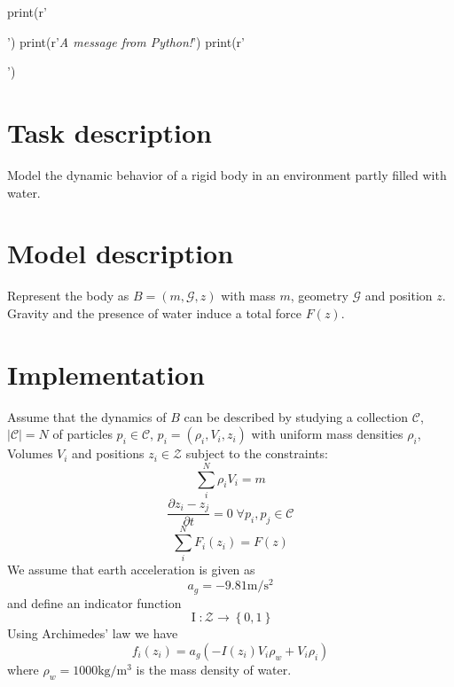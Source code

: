 
\begin{pycode}
print(r'\begin{center}')
print(r'\textit{A message from Python!}')
print(r'\end{center}')
\end{pycode}
\section{Task description}
Model the dynamic behavior of a rigid body in an environment partly filled with water.

\section{Model description}
Represent the body as $B = \left(m, \mathcal{G}, z\right)$ with mass $m$, geometry $\mathcal{G}$ and position $z$. 
Gravity and the presence of water induce a total force $F(z)$.  

\section{Implementation}
Assume that the dynamics of $B$  can be described by studying a collection $\mathcal{C}$, $|\mathcal{C}| = N$ of particles $p_i \in \mathcal{C}$, $p_i = \left(\rho_i, V_i, z_i\right)$ with uniform mass densities $\rho_i$, Volumes $V_i$ and positions $z_i \in \mathcal{Z}$ subject to the constraints:
$$\sum\limits_i^N \rho_i V_i = m$$
$$\frac{\partial z_i - z_j}{\partial t} = 0 \; \forall p_i, p_j \in \mathcal{C}$$
$$\sum\limits_i^N F_i(z_i) = F(z)$$
We assume that earth acceleration is given as
$$a_g = - \num{9.81}  \si{\metre\per\square\second}$$ 
and define an indicator function
$$\operatorname{I}: \mathcal{Z} \to \left\{ 0, 1\right\}$$
Using Archimedes' law we have 
$$f_i(z_i) = a_g(- I(z_i) V_i \rho_w + V_i \rho_i)$$
where $\rho_w = \num{1000} \si{\kilo\gram\per\cubic\metre}$ is the mass density of water.

